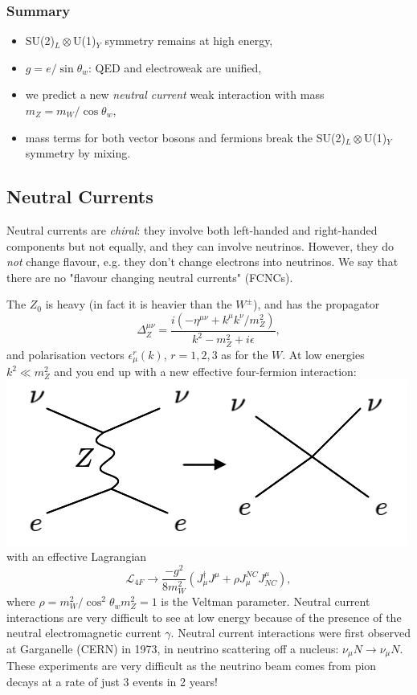 \documentclass[a4paper,12pt]{article}
\begin{document}
\subsubsection{Summary}
%
\begin{itemize}
\item SU(2)$_L \otimes$U(1)$_Y$ symmetry remains at high energy,
\item $g = e/\sin\theta_w$: QED and electroweak are unified,
\item we predict a new \textit{neutral current} weak interaction with mass $m_Z = m_W/\cos\theta_w$,
\item mass terms for both vector bosons and fermions break the SU(2)$_L \otimes$U(1)$_Y$ symmetry by mixing.
\end{itemize}
%
\subsection{Neutral Currents}
%
Neutral currents are \textit{chiral}: they involve both left-handed and right-handed components but not equally, and they can involve neutrinos. However, they do \textit{not} change flavour, e.g. they don't change electrons into neutrinos. We say that there are no "flavour changing neutral currents" (FCNCs). 

The $Z_0$ is heavy (in fact it is heavier than the $W^\pm$), and has the propagator
\begin{equation}
\Delta_Z^{\mu \nu} = \frac{i(-\eta^{\mu \nu} + k^\mu k^\nu/m_Z^2)}{k^2 - m_Z^2 + i \epsilon},
\end{equation}
and polarisation vectors $\epsilon_\mu^r(k)$, $r=1,2,3$ as for the $W$. At low energies $k^2 \ll m_Z^2$ and you end up with a new effective four-fermion interaction:
\newline
  \includegraphics[width=0.6\linewidth]{figs/24a.png}
\newline
with an effective Lagrangian
\begin{equation}
\mathcal{L}_{4F} \to \frac{-g^2}{8m_W^2}(J_\mu^\dagger J^\mu + \rho J_\mu^{NC}J^\mu_{NC}),
\end{equation}
where $\rho = m_W^2/\cos^2\theta_w m_Z^2 =1$ is the Veltman parameter. Neutral current interactions are very difficult to see at low energy because of the  presence of the neutral electromagnetic current $\gamma$. Neutral current interactions were first observed at Garganelle (CERN) in 1973, in neutrino scattering off a nucleus: $\nu_\mu N \to \nu_\mu N$. These experiments are very difficult as the neutrino beam comes from pion decays at a rate of just 3 events in 2 years!
%
\end{document}
